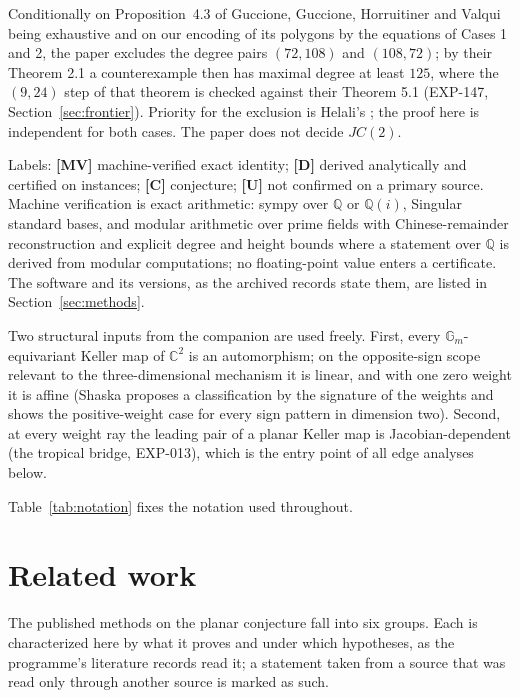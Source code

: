\documentclass[11pt]{article}
\theoremstyle{remark}
\newcommand{\C}{\mathbb{C}}
\newcommand{\Q}{\mathbb{Q}}
\newcommand{\Gm}{\mathbb{G}_m}
\begin{document}
Conditionally on Proposition~4.3 of Guccione, Guccione, Horruitiner and Valqui \cite{GGHV2022} being exhaustive and on our encoding of its
polygons by the equations of Cases 1 and 2, the paper excludes the degree pairs $(72,108)$ and $(108,72)$; by their Theorem 2.1 a
counterexample then has maximal degree at least $125$, where the $(9,24)$ step of that theorem is checked against their Theorem 5.1 (EXP-147, Section~\ref{sec:frontier}). Priority for the
exclusion is Helali's \cite{Helali2026}; the proof here is independent for both cases. The paper does not decide $JC(2)$.

Labels: \textbf{[MV]} machine-verified exact identity; \textbf{[D]} derived analytically and
certified on instances; \textbf{[C]} conjecture; \textbf{[U]} not confirmed on a primary source.
Machine verification is exact arithmetic: sympy over $\Q$ or $\Q(i)$, Singular standard
bases, and modular arithmetic over prime fields with Chinese-remainder reconstruction and
explicit degree and height bounds where a statement over $\Q$ is derived from modular
computations; no floating-point value enters a certificate. The software and its versions, as the
archived records state them, are listed in Section~\ref{sec:methods}.

Two structural inputs from the companion are used freely. First, every $\Gm$-equivariant
Keller map of $\C^2$ is an automorphism; on the opposite-sign scope relevant to the
three-dimensional mechanism it is linear, and with one zero weight it is affine
(Shaska \cite{Shaska2026} proposes a classification by the signature of the weights and shows the positive-weight case for every sign pattern in dimension two). Second, at every
weight ray the leading pair of a planar Keller map is Jacobian-dependent (the tropical bridge,
EXP-013), which is the entry point of all edge analyses below.

Table~\ref{tab:notation} fixes the notation used throughout.



\section{Related work}\label{sec:related}

The published methods on the planar conjecture fall into six groups. Each is characterized
here by what it proves and under which hypotheses, as the programme's literature records read
it; a statement taken from a source that was read only through another source is marked as such.
\end{document}
